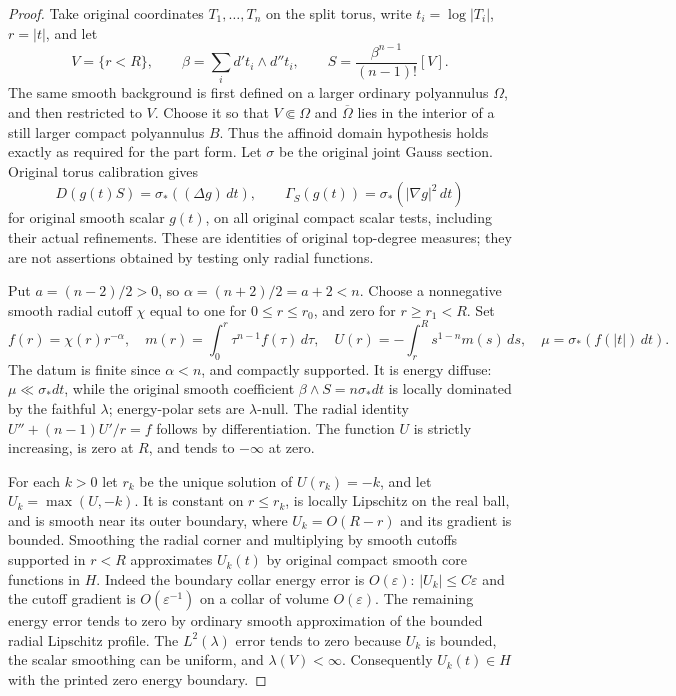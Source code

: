 \documentclass[11pt,a4paper]{article}
\numberwithin{equation}{section}
\theoremstyle{definition}
\theoremstyle{remark}
\begin{document}
\begin{proof}
Take original coordinates $T_1,\ldots,T_n$ on the split torus,
write $t_i=\log|T_i|$, $r=|t|$, and let
\[
 V=\{r<R\},\qquad
 \beta=\sum_i d't_i\wedge d''t_i,\qquad
 S=\frac{\beta^{n-1}}{(n-1)!}[V].
 \tag{RO2}
\]
The same smooth background is first defined on a larger ordinary
polyannulus $\Omega$, and then restricted to $V$.  Choose it so
that $V\Subset\Omega$ and $\overline\Omega$ lies in the interior
of a still larger compact polyannulus $B$.  Thus the affinoid
domain hypothesis holds exactly as required for the part form.
Let $\sigma$ be the original joint Gauss section.
Original torus calibration gives
\[
 D(g(t)S)=\sigma_*((\Delta g)\,dt),\qquad
 \Gamma_S(g(t))=\sigma_*(|\nabla g|^2\,dt)
 \tag{RO3}
\]
for original smooth scalar $g(t)$, on all original compact
scalar tests, including their actual refinements.
These are identities of original top-degree measures; they
are not assertions obtained by testing only radial functions.

Put $a=(n-2)/2>0$, so $\alpha=(n+2)/2=a+2<n$.
Choose a nonnegative smooth radial cutoff $\chi$ equal to
one for $0\le r\le r_0$, and zero for $r\ge r_1<R$.
Set
\[
 f(r)=\chi(r)r^{-\alpha},\quad
 m(r)=\int_0^r \tau^{n-1}f(\tau)\,d\tau,\quad
 U(r)=-\int_r^R s^{1-n}m(s)\,ds,\quad
 \mu=\sigma_*(f(|t|)\,dt).
 \tag{RO4}
\]
The datum is finite since $\alpha<n$, and compactly supported.
It is energy diffuse: $\mu\ll\sigma_*dt$, while the original
smooth coefficient $\beta\wedge S=n\sigma_*dt$ is locally
dominated by the faithful $\lambda$; energy-polar sets are
$\lambda$-null.  The radial identity
$U''+(n-1)U'/r=f$ follows by differentiation.
The function $U$ is strictly increasing, is zero at $R$, and
tends to $-\infty$ at zero.

For each $k>0$ let $r_k$ be the unique solution of $U(r_k)=-k$,
and let $U_k=\max(U,-k)$.  It is constant on $r\le r_k$,
is locally Lipschitz on the real ball, and is smooth near
its outer boundary, where $U_k=O(R-r)$ and its gradient is
bounded.  Smoothing the radial corner and multiplying by
smooth cutoffs supported in $r<R$ approximates $U_k(t)$ by
original compact smooth core functions in $H$.
Indeed the boundary collar energy error is $O(\varepsilon)$:
$|U_k|\le C\varepsilon$ and the cutoff gradient is
$O(\varepsilon^{-1})$ on a collar of volume $O(\varepsilon)$.
The remaining energy error tends to zero by ordinary smooth
approximation of the bounded radial Lipschitz profile.
The $L^2(\lambda)$ error tends to zero because $U_k$ is bounded,
the scalar smoothing can be uniform, and $\lambda(V)<\infty$.
Consequently $U_k(t)\in H$ with the printed zero energy boundary.


\end{proof}
\end{document}
